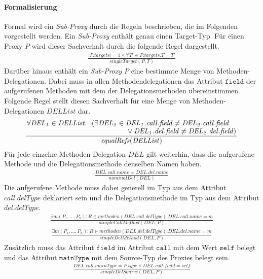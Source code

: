 \documentclass[a4paper,12pt]{article}
\begin{document}
\paragraph{Formalisierung}
Formal wird ein \emph{Sub-Proxy} durch die Regeln beschrieben, die im Folgenden vorgestellt werden. Ein \emph{Sub-Proxy} enthält genau einen Target-Typ. Für einen Proxy $P$ wird dieser Sachverhalt durch die folgende Regel dargestellt.
\begin{gather*}
\frac{|P.targets| = 1 \wedge \forall T' \in P.targets. T = T'}{\mathit{singleTarget(P,T)}}
\end{gather*}
Darüber hinaus enthält ein \emph{Sub-Proxy} $P$ eine bestimmte Menge von Methoden-Delegationen. Dabei muss in allen Methodendelegationen das Attribut $\texttt{field}$ der aufgerufenen Methoden mit dem der Delegationsmethoden übereinstimmen. Folgende Regel stellt diesen Sachverhalt für eine Menge von Methoden-Delegationen $\mathit{DELList}$ dar.
\begin{gather*}
\frac{\splitfrac{\forall \mathit{DEL_1}\in \mathit{DELList}. \neg(\exists \mathit{DEL_2} \in \mathit{DEL_1.call.field} \neq \mathit{DEL_2.call.field}}{ \vee \mathit{DEL_1.del.field} \neq \mathit{DEL_2.del.field} )}}
{\mathit{equalRefs(DELList)}}
\end{gather*}
Für jede einzelne Methoden-Delegation $\mathit{DEL}$ gilt weiterhin, dass die aufgerufene Methode und die Delegationsmethode denselben Namen haben.
\begin{gather*}
\frac{\mathit{DEL.call.name} = \mathit{DEL.del.name}}
{\mathit{nominalDel(DEL)}}
\end{gather*}
Die aufgerufene Methode muss dabei generell im Typ aus dem Attribut $call.delType$ deklariert sein und die Delegationsmethode im Typ aus dem Attribut $del.delType$.
\begin{gather*}
\frac{\exists m(P_1,...,P_n):R \in \mathit{methoden(DEL.call.delType)}. \mathit{DEL.call.name} = m}
{\mathit{simpleCallMethod(DEL, P)}}
\end{gather*}
\begin{gather*}
\frac{\exists m(P_1,...,P_n):R \in \mathit{methoden(DEL.del.delType)}. \mathit{DEL.del.name} = m}
{\mathit{simpleDelMethod(DEL, P)}}
\end{gather*}
Zusätzlich muss das Attribut $\texttt{field}$ im Attribut $\texttt{call}$ mit dem Wert $\texttt{self}$ belegt und das Attribut $\texttt{mainType}$ mit dem Source-Typ des Proxies belegt sein.
\begin{gather*}
\frac{\mathit{DEL.call.mainType} = \mathit{P.type} \wedge \mathit{DEL.call.field} = \mathit{self}}
{\mathit{simpleDelSource(DEL, P)}}
\end{gather*}
\end{document}
